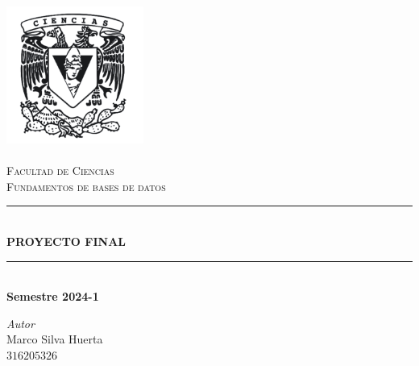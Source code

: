 \begin{titlepage}
    \center %
    \newcommand{\HRule}{\rule{\linewidth}{0.5mm}} 
    
    \includegraphics[width=4.5cm]{IMA/Ciencias.png} \\ 
    
    \quad \\[1.5cm]
    
    \textsc{\Large Facultad de Ciencias}\\[0.5cm] 
    \textsc{\Large Fundamentos de bases de datos}\\[0.5cm] 
    
    \makeatletter
        \HRule \\ [0.4cm]
            { \huge \bfseries PROYECTO FINAL} \\
        \HRule \\ [0.4cm]
    \large\textbf{Semestre 2024-1}\\
    \vspace{20mm}
    \begin{minipage}{0.4\textwidth}
        \begin{flushright} \large
        \centering
            \emph{Autor} \\ %
            \vspace{3mm}
            Marco Silva Huerta\\
            $316205326$            
        \end{flushright}
    \end{minipage}\\[2cm]    


\end{titlepage}
